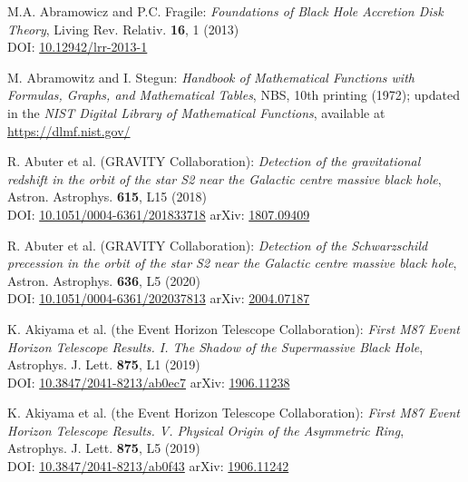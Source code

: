 \begin{thebibliography}{123}

\setlength{\itemsep}{-2pt plus1pt minus1pt}  %

M.A. Abramowicz and P.C. Fragile:
{\em Foundations of Black Hole Accretion Disk Theory},
Living Rev. Relativ. {\bf 16}, 1 (2013)\\
DOI: \href{https://doi.org/10.12942/lrr-2013-1}{10.12942/lrr-2013-1}

M. Abramowitz and I. Stegun:
{\em Handbook of Mathematical Functions with Formulas, Graphs, and Mathematical Tables},
NBS, 10th printing (1972); updated in the
{\em NIST Digital Library of Mathematical Functions}, available at\\
\url{https://dlmf.nist.gov/}

R. Abuter et al. (GRAVITY Collaboration):
{\em Detection of the gravitational redshift in the orbit of the star S2 near the Galactic centre massive black hole},
Astron. Astrophys. {\bf 615}, L15 (2018)\\
DOI: \href{https://doi.org/10.1051/0004-6361/201833718}{10.1051/0004-6361/201833718}\hfill
arXiv: \href{https://arxiv.org/abs/1807.09409}{1807.09409}

R. Abuter et al. (GRAVITY Collaboration):
{\em Detection of the Schwarzschild precession in the orbit of the star
S2 near the Galactic centre massive black hole},
Astron. Astrophys. {\bf 636}, L5 (2020)\\
DOI: \href{https://doi.org/10.1051/0004-6361/202037813}{10.1051/0004-6361/202037813}\hfill
arXiv: \href{https://arxiv.org/abs/2004.07187}{2004.07187}

K. Akiyama et al. (the Event Horizon Telescope Collaboration):
{\em First M87 Event Horizon Telescope Results. I. The Shadow of the Supermassive Black Hole},
Astrophys. J. Lett. {\bf 875}, L1 (2019)\\
DOI: \href{https://doi.org/10.3847/2041-8213/ab0ec7}{10.3847/2041-8213/ab0ec7}\hfill
arXiv: \href{https://arxiv.org/abs/1906.11238}{1906.11238}

K. Akiyama et al. (the Event Horizon Telescope Collaboration):
{\em First M87 Event Horizon Telescope Results. V. Physical Origin of the Asymmetric Ring},
Astrophys. J. Lett. {\bf 875}, L5 (2019)\\
DOI: \href{https://doi.org/10.3847/2041-8213/ab0f43}{10.3847/2041-8213/ab0f43}\hfill
arXiv: \href{https://arxiv.org/abs/1906.11242}{1906.11242}


\end{thebibliography}
